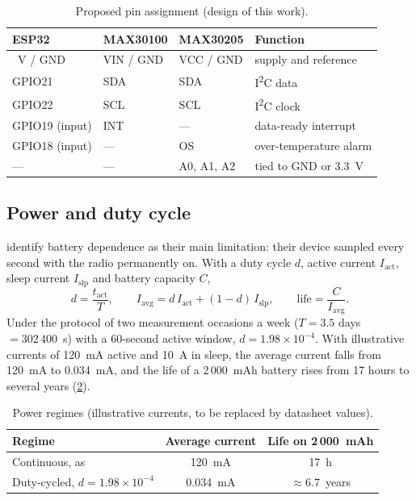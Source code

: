 \begin{table}[htbp]
\centering\small
\caption{Proposed pin assignment (design of this work).}\label{tab:pinout}
\begin{tabularx}{\textwidth}{@{}>{\raggedright\arraybackslash}p{2.8cm} >{\raggedright\arraybackslash}p{2.0cm} >{\raggedright\arraybackslash}p{2.2cm} X@{}}
\toprule
\textbf{ESP32} & \textbf{MAX30100} & \textbf{MAX30205} & \textbf{Function} \\
\midrule
3.3~V / GND & VIN / GND & VCC / GND & supply and reference \\
GPIO21 & SDA & SDA & I\textsuperscript{2}C data \\
GPIO22 & SCL & SCL & I\textsuperscript{2}C clock \\
GPIO19 (input) & INT & --- & data-ready interrupt \\
GPIO18 (input) & --- & OS & over-temperature alarm \\
--- & --- & A0, A1, A2 & tied to GND or 3.3~V \\
\bottomrule
\end{tabularx}
\end{table}

\subsection{Power and duty cycle}\label{sec:power}\label{sec:power-arithmetic}\label{sec:power-crossover}

\Textcite{efendi2025} identify battery dependence as their main limitation: their device sampled every second with the radio permanently on. With a duty cycle $d$, active current $I_{\text{act}}$, sleep current $I_{\text{slp}}$ and battery capacity $C$,
\begin{equation}
  d = \frac{t_{\text{act}}}{T}, \qquad
  I_{\text{avg}} = d\,I_{\text{act}} + (1-d)\,I_{\text{slp}}, \qquad
  \text{life} = \frac{C}{I_{\text{avg}}}.
\end{equation}
Under the protocol of two measurement occasions a week ($T = 3.5$ days $= 302\,400$~s) with a 60-second active window, $d = 1.98 \times 10^{-4}$. With illustrative currents of 120~mA active and 10~\textmu A in sleep, the average current falls from 120~mA to 0.034~mA, and the life of a 2\,000~mAh battery rises from 17 hours to several years (\cref{tab:power-regimes}).

\begin{table}[htbp]
\centering\small
\caption{Power regimes (illustrative currents, to be replaced by datasheet values).}\label{tab:power-regimes}
\begin{tabularx}{\textwidth}{@{}X c c@{}}
\toprule
\textbf{Regime} & \textbf{Average current} & \textbf{Life on 2\,000~mAh} \\
\midrule
Continuous, as \textcite{efendi2025} & 120~mA & 17~h \\
Duty-cycled, $d = 1.98\times10^{-4}$ & 0.034~mA & $\approx 6.7$~years \\
\bottomrule
\end{tabularx}
\end{table}

